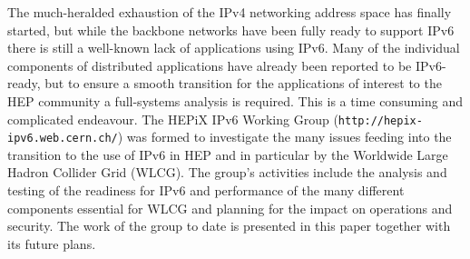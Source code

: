 The much-heralded exhaustion of the IPv4 networking address space has finally started,
but while the backbone networks have been fully ready to support IPv6 there is still a well-known lack of 
applications using IPv6.
Many of the individual components of distributed applications have already been reported to be IPv6-ready,
but to ensure a smooth transition for the applications of interest to the HEP community a full-systems analysis 
is required. This is a time consuming and complicated endeavour.
The HEPiX IPv6 Working Group ({\tt http://hepix-ipv6.web.cern.ch/}) was formed to investigate the many issues feeding into the 
transition to the use of IPv6 in HEP and in particular by the Worldwide Large Hadron Collider Grid (WLCG). 
The group's activities include the analysis and testing of the readiness for IPv6 and 
performance of the many different components essential for WLCG and planning for the impact on 
operations and security. The work of the group to date is presented in this paper together with its future plans.
